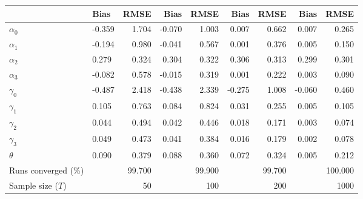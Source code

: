 
\begin{tabular}[t]{llrrrrrrr}
\toprule
  & Bias & RMSE & Bias & RMSE & Bias & RMSE & Bias & RMSE\\
\midrule
$\alpha_{0}$ & -0.359 & 1.704 & -0.070 & 1.003 & 0.007 & 0.662 & 0.007 & 0.265\\
$\alpha_{1}$ & -0.194 & 0.980 & -0.041 & 0.567 & 0.001 & 0.376 & 0.005 & 0.150\\
$\alpha_{2}$ & 0.279 & 0.324 & 0.304 & 0.322 & 0.306 & 0.313 & 0.299 & 0.301\\
$\alpha_{3}$ & -0.082 & 0.578 & -0.015 & 0.319 & 0.001 & 0.222 & 0.003 & 0.090\\
$\gamma_{0}$ & -0.487 & 2.418 & -0.438 & 2.339 & -0.275 & 1.008 & -0.060 & 0.460\\
$\gamma_{1}$ & 0.105 & 0.763 & 0.084 & 0.824 & 0.031 & 0.255 & 0.005 & 0.105\\
$\gamma_{2}$ & 0.044 & 0.494 & 0.042 & 0.446 & 0.018 & 0.171 & 0.003 & 0.074\\
$\gamma_{3}$ & 0.049 & 0.473 & 0.041 & 0.384 & 0.016 & 0.179 & 0.002 & 0.078\\
$\theta$ & 0.090 & 0.379 & 0.088 & 0.360 & 0.072 & 0.324 & 0.005 & 0.212\\
Runs converged (\%) &  & 99.700 &  & 99.900 &  & 99.700 &  & 100.000\\
Sample size ($T$) &  & 50 &  & 100 &  & 200 &  & 1000\\
\bottomrule
\end{tabular}
